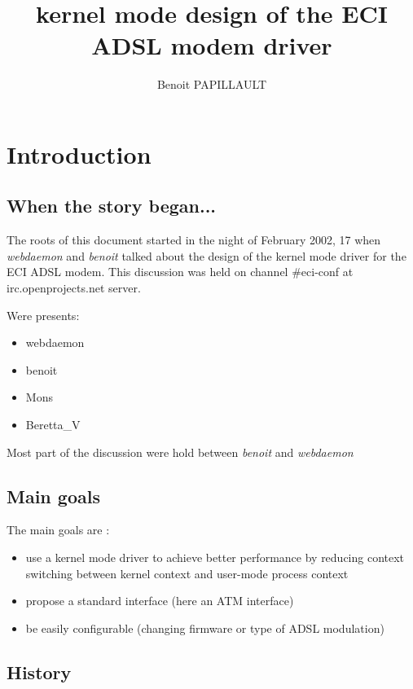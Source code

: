\documentclass[a4paper,12pt]{article}
\title{\huge{kernel mode design of the ECI ADSL modem driver}}
\author{Benoit PAPILLAULT}
\begin{document}
\maketitle
\newpage
\tableofcontents
\newpage

\section{Introduction}

\subsection{When the story began...}

The roots of this document started in the night of February 2002, 17
when \textit{webdaemon} and \textit{benoit} talked about the design of
the kernel mode driver for the ECI ADSL modem. This discussion was
held on channel \#eci-conf at irc.openprojects.net server.

Were presents:
\begin{itemize}
\item webdaemon
\item benoit
\item Mons
\item Beretta\_V
\end{itemize}

Most part of the discussion were hold between \textit{benoit} and
\textit{webdaemon}

\subsection{Main goals}

The main goals are :
\begin{itemize}
  
\item use a kernel mode driver to achieve better performance by
  reducing context switching between kernel context and user-mode
  process context

\item propose a standard interface (here an ATM interface)

\item be easily configurable (changing firmware or type of ADSL
  modulation)

\end{itemize}

\subsection{History}
\end{document}
